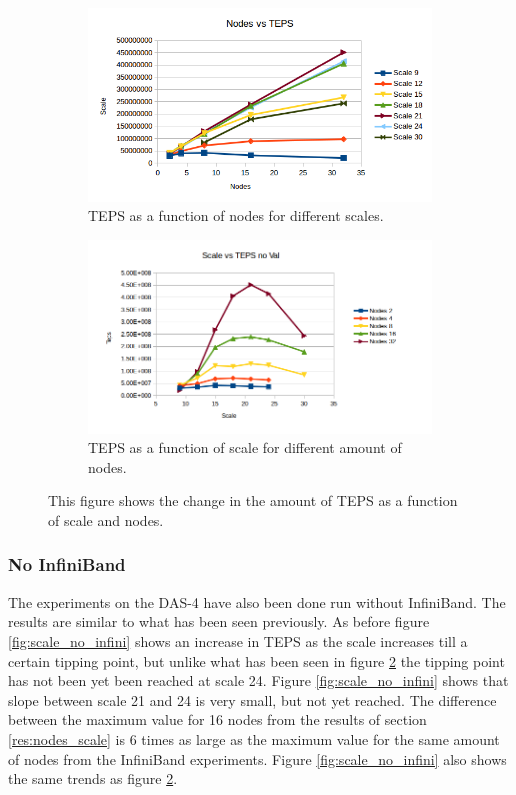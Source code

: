 \begin{figure}[!h]
\centering
\begin{subfigure}{.5\textwidth}
  \centering
  \includegraphics[width=\linewidth]{images/nodes_no_val.png}
  \caption{TEPS as a function of nodes for different scales.}
  \label{fig:nodes_no_val}
\end{subfigure}%
\begin{subfigure}{.5\textwidth}
  \centering
  \includegraphics[width=\linewidth]{images/scale_no_val.png}
  \caption{TEPS as a function of scale for different amount of nodes.}
  \label{fig:scale_no_val}
\end{subfigure}
\caption{This figure shows the change in the amount of TEPS as a function of scale and nodes.}
\label{fig:das_no_val}
\end{figure}

\subsubsection{No InfiniBand}
The experiments on the DAS-4 have also been done run without InfiniBand. The results are similar to what has been seen previously. As before figure \ref{fig:scale_no_infini} shows an increase in TEPS as the scale increases till a certain tipping point, but unlike what has been seen in figure \ref{fig:scale_no_val} the tipping point has not been yet been reached at scale 24. Figure \ref{fig:scale_no_infini} shows that slope between scale 21 and 24 is very small, but not yet reached. The difference between the maximum value for 16 nodes from the results of section \ref{res:nodes_scale} is 6 times as large as the maximum value for the same amount of nodes from the InfiniBand experiments.
Figure \ref{fig:scale_no_infini} also shows the same trends as figure \ref{fig:scale_no_val}. 
 
